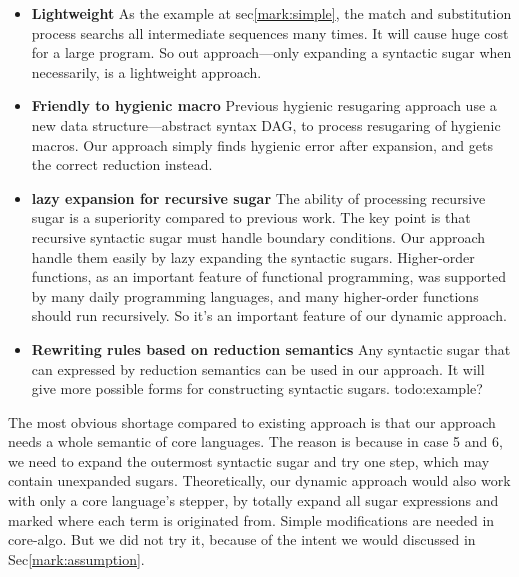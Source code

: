 \begin{itemize}
	\item {\bfseries Lightweight} As the example at sec\ref{mark:simple}, the match and substitution process searchs all intermediate sequences many times. It will cause huge cost for a large program. So out approach---only expanding a syntactic sugar when necessarily, is a lightweight approach.
	\item {\bfseries Friendly to hygienic macro} Previous hygienic resugaring approach use a new data structure---abstract syntax DAG, to process resugaring of hygienic macros. Our approach simply finds hygienic error after expansion, and gets the correct reduction instead. 
	\item {\bfseries lazy expansion for recursive sugar} The ability of processing recursive sugar is a superiority compared to previous work. The key point is that recursive syntactic sugar must handle boundary conditions. Our approach handle them easily by lazy expanding the syntactic sugars. Higher-order functions, as an important feature of functional programming, was supported by many daily programming languages, and many higher-order functions should run recursively. So it's an important feature of our dynamic approach.
	\item {\bfseries Rewriting rules based on reduction semantics} Any syntactic sugar that can expressed by reduction semantics can be used in our approach. It will give more possible forms for constructing syntactic sugars. todo:example?
\end{itemize}

The most obvious shortage compared to existing approach is that our approach needs a whole semantic of core languages. The reason is because in case 5 and 6, we need to expand the outermost syntactic sugar and try one step, which may contain unexpanded sugars. Theoretically, our dynamic approach would also work with only a core language's stepper, by totally expand all sugar expressions and marked where each term is originated from. Simple modifications are needed in core-algo. But we did not try it, because of the intent we would discussed in Sec\ref{mark:assumption}.
